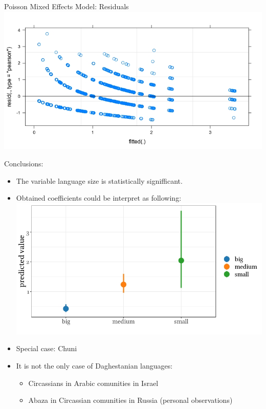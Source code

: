 \documentclass[13pt, t]{beamer}
\begin{document}
\begin{frame}{Poisson Mixed Effects Model: Residuals}
\includegraphics[width=\linewidth]{images/14_poisson_residuals_750_400}
\end{frame}

\begin{frame}{Conclusions:}
\begin{itemize}
\item The variable language size is statistically signifficant.
\item Obtained coefficients could be interpret as following:\\
\includegraphics[width=\linewidth]{images/15_predicted_750_400} \pause
\item Special case: Chuni \pause
\item It is not the only case of Daghestanian languages:
\begin{itemize}
\item Circassians in Arabic comunities in Israel \citep{kreindler95}
\item Abaza in Circassian comunities in Russia (personal observations)
\end{itemize}
\end{itemize}
\end{frame}
\end{document}
